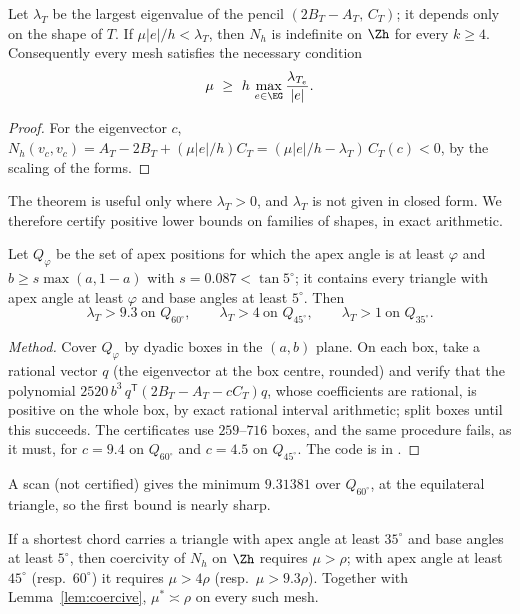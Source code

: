 \begin{theorem}\label{thm:pb1}
Let $\lambda_T$ be the largest eigenvalue of the pencil $(2B_T-A_T,\,C_T)$; it depends only on the shape of $T$. If $\mu|e|/h<\lambda_T$, then $N_h$ is indefinite on $\Zh$ for every $k\ge4$. Consequently every mesh satisfies the necessary condition
\[
\mu\ \ge\ h\,\max_{e\in\EG}\frac{\lambda_{T_e}}{|e|} .
\]
\end{theorem}

\begin{proof}
For the eigenvector $c$, $N_h(v_c,v_c)=A_T-2B_T+(\mu|e|/h)C_T=(\mu|e|/h-\lambda_T)\,C_T(c)<0$, by the scaling of the forms.
\end{proof}

The theorem is useful only where $\lambda_T>0$, and $\lambda_T$ is not given in closed form. We therefore certify positive lower bounds on families of shapes, in exact arithmetic.

\begin{proposition}\label{prop:cert}
Let $Q_\varphi$ be the set of apex positions for which the apex angle is at least $\varphi$ and $b\ge s\max(a,1-a)$ with $s=0.087<\tan5^\circ$; it contains every triangle with apex angle at least $\varphi$ and base angles at least $5^\circ$. Then
\[
\lambda_T>9.3\ \text{on }Q_{60^\circ},\qquad \lambda_T>4\ \text{on }Q_{45^\circ},\qquad \lambda_T>1\ \text{on }Q_{35^\circ}.
\]
\end{proposition}

\begin{proof}[Method]
Cover $Q_\varphi$ by dyadic boxes in the $(a,b)$ plane. On each box, take a rational vector $q$ (the eigenvector at the box centre, rounded) and verify that the polynomial $2520\,b^3\,q^{\mathsf T}(2B_T-A_T-cC_T)q$, whose coefficients are rational, is positive on the whole box, by exact rational interval arithmetic; split boxes until this succeeds. The certificates use $259$--$716$ boxes, and the same procedure fails, as it must, for $c=9.4$ on $Q_{60^\circ}$ and $c=4.5$ on $Q_{45^\circ}$. The code is in \cite{ZeroGradRepo}.
\end{proof}

A scan (not certified) gives the minimum $9.31381$ over $Q_{60^\circ}$, at the equilateral triangle, so the first bound is nearly sharp.

\begin{corollary}\label{cor:rho}
If a shortest chord carries a triangle with apex angle at least $35^\circ$ and base angles at least $5^\circ$, then coercivity of $N_h$ on $\Zh$ requires $\mu>\rho$; with apex angle at least $45^\circ$ (resp.\ $60^\circ$) it requires $\mu>4\rho$ (resp.\ $\mu>9.3\rho$). Together with Lemma~\ref{lem:coercive}, $\mu^\ast\asymp\rho$ on every such mesh.
\end{corollary}

